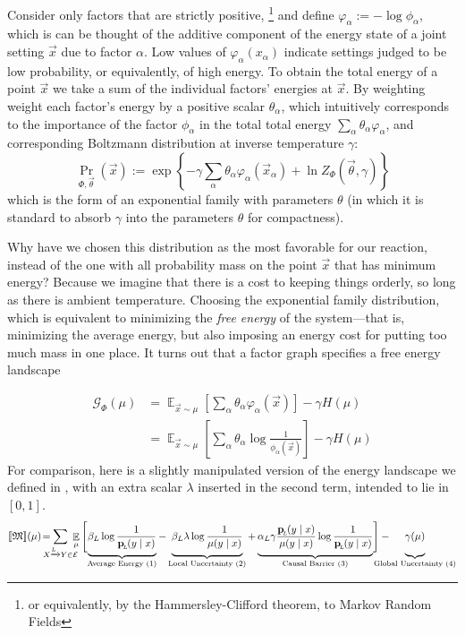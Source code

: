 \documentclass{article}
\theoremstyle{plain}
\theoremstyle{definition}
\theoremstyle{remark}
\DeclarePairedDelimiter{\bbr}{\llbracket}{\rrbracket}
\let\H\relax
\DeclareMathOperator{\H}{\mathrm{H}} %
\DeclareMathOperator*{\E}{\mathbb{E}} %
\newcommand\mat[1]{\mathbf{#1}}
\newcommand{\bp}[1][L]{\mat{p}_{\!_{#1}\!}}
\newcommand{\Ed}{\mathcal E}
\newcommand{\dg}[1]{\mathfrak{#1}}
\numberwithin{equation}{section}
\begin{document}
	Consider only factors that are strictly positive,%
		\footnote{or equivalently, by the Hammersley-Clifford theorem, to Markov Random Fields}
	and define $ \varphi_\alpha := -\log \phi_\alpha$, which is can be thought of the additive component of the energy state of a joint setting $\vec x$ due to factor $\alpha$. 
	Low values of $\varphi_\alpha(x_\alpha)$ indicate settings judged to be low probability, or equivalently, of high energy. 
	To obtain the total energy of a point $\vec x$ we take a sum of the individual factors' energies at $\vec x$. By weighting weight each factor's energy by a positive scalar $\theta_\alpha$, which intuitively corresponds to the importance of the factor $\phi_\alpha$ in the total total energy $\sum_\alpha \theta_\alpha \varphi_\alpha$,
	and corresponding Boltzmann distribution at inverse temperature $\gamma$:
	\[ \Pr_{\Phi, \vec\theta} (\vec x)  := \exp \left\{ -\gamma \sum_\alpha \theta_\alpha \varphi_\alpha(\vec x_\alpha)  + \ln Z_\Phi(\vec \theta, \gamma) \right\} \] 
	which is the form of an exponential family with parameters $\theta$ (in which it is standard to absorb $\gamma$ into the parameters $\theta$ for compactness).
	
	Why have we chosen this distribution as the most favorable for our reaction, instead of the one with all probability mass on the point $\vec x$ that has minimum energy? Because we imagine that there is a cost to keeping things orderly, so long as there is ambient temperature. Choosing the exponential family distribution, which is equivalent to minimizing the \emph{free energy} of the system---that is, minimizing the average energy, but also imposing an energy cost for putting too much mass in one place. It turns out that a factor graph specifies a free energy landscape
	
	\begin{align*}
		\mathcal G_\Phi(\mu) &=  \E_{\vec x \sim \mu} \left[\sum_\alpha \theta_\alpha \varphi_\alpha(\vec x) \right] - \gamma H(\mu) \\
			&= \E_{\vec x \sim \mu} \left[\sum_\alpha \theta_\alpha \log \frac{1}{\phi_\alpha(\vec x)} \right] - \gamma H(\mu)
	\end{align*}
	For comparison, here is a slightly manipulated version of the energy landscape we defined in , with an extra scalar $\lambda$ inserted in the second term, intended to lie in $[0,1]$.
	\begin{equation*}
		\bbr{\dg M}(\mu) \!=\mskip-18mu \sum_{ X \xrightarrow{\!\!L} Y  \in \Ed } \!\!\!\!\E_\mu  \Bigg[\!
			\underbrace{\beta_L \log \frac{1}{\bp(y\mid x)} \vphantom{\Bigg|}}_{\text{Average Energy (1)}}  - 
			\underbrace{\beta_L \lambda \log \frac{1}{\mu(y \mid x)}  \vphantom{\Bigg|}}_{\text{Local Uncertainty (2)}}  + 
			\underbrace{\alpha_L \gamma \frac{\bp(y \mid x)}{\mu(y \mid x)}\log \frac{1}{\bp(y\mid x)}  \vphantom{\Bigg|}}_{\text{Causal Barrier (3)}}\! \Bigg] - 
			\mskip-31mu\underbrace{\gamma \H(\mu) \vphantom{\Bigg|} }_{\text{Global Uncertainty (4)}}
	\end{equation*}
\end{document}
